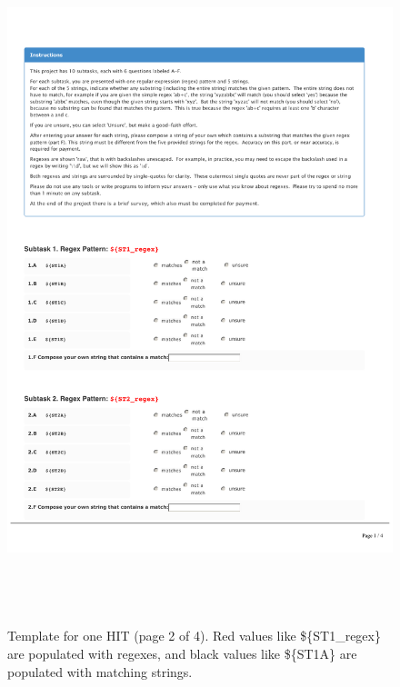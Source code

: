 \begin{figure}[!htbp]
       \includegraphics[page=2, height=20cm, keepaspectratio]{nontex/MTtemplate}
 \caption{Template for one HIT (page 2 of 4).  Red values like  \$\{ST1\_regex\} are populated with regexes, and black values like \$\{ST1A\} are populated with matching strings.}
 \label{fig:MTtemplate2}
\end{figure}

